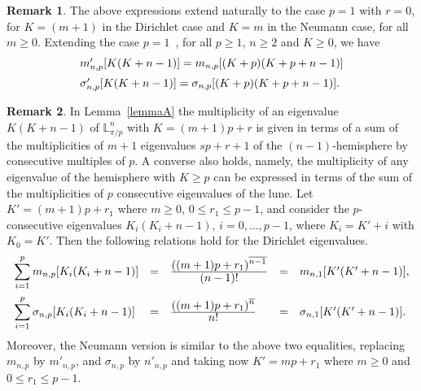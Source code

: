 \documentclass[11pt,a4paper,times]{amsart}
\theoremstyle{plain}
\theoremstyle{definition}
\newtheorem{remark}{Remark}[section]
\numberwithin{equation}{section}
\newcommand{\ds}{\displaystyle}
\newcommand{\dsum}{\ds\sum}
\newcommand{\eqskip}{ \vspace*{2mm}\\ }
\newcommand{\fr}[2]{\frac{\ds #1}{\ds #2}}
\newcommand{\lune}[2]{\mathbb{L}^{#1}_{#2}}
\begin{document}
{\begin{remark}
The above expressions extend naturally to the case $p=1$ with $r=0$, for $K=(m+1)$ in the Dirichlet case and  $K=m$ in the Neumann case, for all $m\geq 0$.
Extending the case $p=1$~\cite[Sections 2.1 and 2.2]{fms}, for  all $p\geq 1$, $n\geq 2$ and $K\geq 0$, we have
\[ \begin{array}{l}
m'_{n,p}[K(K+n-1)]=m_{n,p}[(K+p)(K+p+n-1)]
\eqskip
\sigma'_{n,p}[K(K+n-1)]=\sigma_{n,p}[(K+p)(K+p+n-1)].\end{array}
\]
\end{remark}
%
\begin{remark}
In Lemma~\ref{lemmaA}  the multiplicity of an  eigenvalue $K(K+n-1)$ of $\lune{n}{\pi/p}$  with $K=(m+1)p+r$ is given in terms of a sum
of the multiplicities of $m+1$  
  eigenvalues $sp+r+1$ of the $(n-1)$-hemisphere by consecutive   multiples of $p$.  A converse also holds, namely,
 the multiplicity of any   eigenvalue of the hemisphere with $K\geq p$ can be expressed in terms of the sum of the multiplicities of $p$
 consecutive  eigenvalues of the lune. Let $K'=(m+1)p+r_1$ where $m\geq 0$, $0\leq r_1\leq p-1$, and consider the $p$-consecutive eigenvalues
 $K_i(K_i+n-1)$, $i=0,\ldots, p-1$, where $K_i=K'+i$ with $K_{0}=K'$.
Then the following relations hold for the Dirichlet eigenvalues.
\begin{equation}\label{consecutivep-sum2}
\begin{array}{lllll}
\dsum_{i=1}^{p}m_{n,p}[K_i(K_i+n-1)]
&=& \fr{((m+1)p+r_1)^{\overline{n-1}}}{(n-1)!} & = & m_{n,1}[K'(K'+n-1)],\eqskip
\dsum_{i=1}^{p}\sigma_{n,p}[K_i(K_i+n-1)]
&=& \fr{((m+1)p+r_1)^{\overline{n}}}{n!} & = & \sigma_{n,1}[K'(K'+n-1)].
\end{array}
\end{equation}
  Moreover, the Neumann version is similar to the above two equalities, replacing  $m_{n,p}$ by $m'_{n,p}$,  and $\sigma_{n,p}$ by
$n'_{n,p}$ and taking now $ K'=mp+r_1$
where $m\geq 0$ and $0\leq r_1\leq p-1$.
 

\end{remark}}
\end{document}
